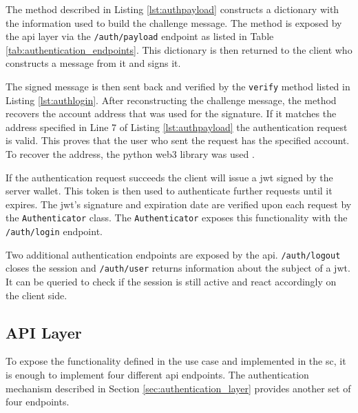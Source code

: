 

The method described in Listing \ref{lst:authpayload} constructs a dictionary with the information used to build the challenge message. The method is exposed by the \gls{api} layer via the \texttt{/auth/payload} endpoint as listed in Table \ref{tab:authentication_endpoints}. This dictionary is then returned to the client who constructs a message from it and signs it.



The signed message is then sent back and verified by the \texttt{verify} method listed in Listing \ref{lst:authlogin}. After reconstructing the challenge message, the method recovers the account address that was used for the signature. If it matches the address specified in Line 7 of Listing \ref{lst:authpayload} the authentication request is valid. This proves that the user who sent the request has the specified account. To recover the address, the python web3 library was used \cite{web3python}.

If the authentication request succeeds the client will issue a \gls{jwt} signed by the server wallet. This token is then used to authenticate further requests until it expires. The \gls{jwt}'s signature and expiration date are verified upon each request by the \texttt{Authenticator} class. The \texttt{Authenticator} exposes this functionality with the \texttt{/auth/login} endpoint.

Two additional authentication endpoints are exposed by the \gls{api}. \texttt{/auth/logout} closes the session and \texttt{/auth/user} returns information about the subject of a \gls{jwt}. It can be queried to check if the session is still active and react accordingly on the client side.

\subsection{API Layer}
To expose the functionality defined in the use case and implemented in the \gls{sc}, it is enough to implement four different \gls{api} endpoints. The authentication mechanism described in Section \ref{sec:authentication_layer} provides another set of four endpoints.

